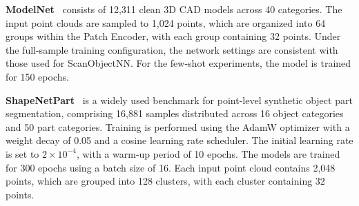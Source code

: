 
\textbf{ModelNet}~\cite{wu20153d} consists of 12,311 clean 3D CAD models across 40 categories. The input point clouds are sampled to 1,024 points, which are organized into 64 groups within the Patch Encoder, with each group containing 32 points. Under the full-sample training configuration, the network settings are consistent with those used for ScanObjectNN. For the few-shot experiments, the model is trained for 150 epochs.



\textbf{ShapeNetPart}~\cite{yi2016scalable} is a widely used benchmark for point-level synthetic object part segmentation, comprising 16,881 samples distributed across 16 object categories and 50 part categories. Training is performed using the AdamW optimizer with a weight decay of 0.05 and a cosine learning rate scheduler. The initial learning rate is set to $2 \times 10^{-4}$, with a warm-up period of 10 epochs. The models are trained for 300 epochs using a batch size of 16. Each input point cloud contains 2,048 points, which are grouped into 128 clusters, with each cluster containing 32 points.



